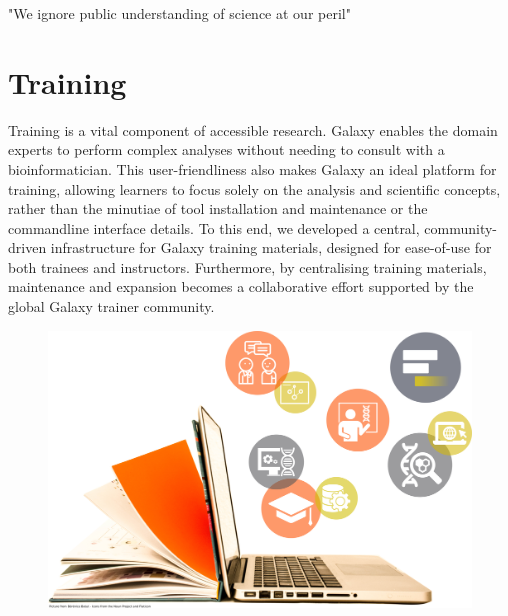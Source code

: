 \begin{savequote}[75mm]
"We ignore public understanding of science at our peril"
\end{savequote}

\chapter{Training}\label{chapter:training}

Training is a vital component of accessible research. Galaxy enables the domain experts to perform complex analyses without needing to consult with a bioinformatician. This user-friendliness also makes Galaxy an ideal platform for training, allowing learners to focus solely on the analysis and scientific concepts, rather than the minutiae of tool installation and maintenance or the commandline interface details. To this end, we developed a central, community-driven infrastructure for Galaxy training materials, designed for ease-of-use for both trainees and instructors. Furthermore, by centralising training materials, maintenance and expansion becomes a collaborative effort supported by the global Galaxy trainer community.

\begin{figure}[t!]
\includegraphics[scale=0.05]{chapters/images/training-coverart.jpg}
\end{figure}
\setcounter{figure}{-1}
\setcounter{table}{-1}
\setcounter{section}{-1}
